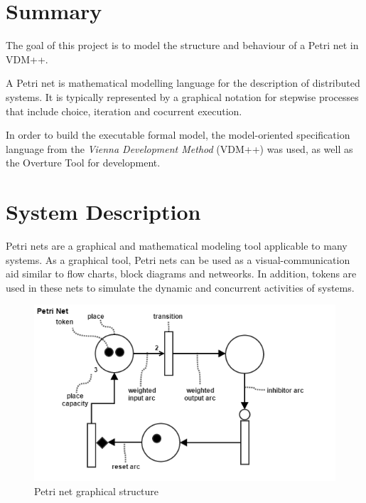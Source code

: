 \documentclass[a4paper]{article}
\begin{document}

\newpage

\section {Summary}

The goal of this project is to model the structure and behaviour of a Petri net in VDM++.

A Petri net is mathematical modelling language for the description of distributed systems. It is typically represented by a graphical notation for stepwise processes that include choice, iteration and cocurrent execution.

In order to build the executable formal model, the model-oriented specification language from the \emph{Vienna Development Method} (VDM++) was used, as well as the Overture Tool\cite{Overture} for development.

\newpage

\section {System Description}
\label{sec:system_description}

Petri nets are a graphical and mathematical modeling tool applicable to many systems. As a graphical tool, Petri nets can be used as a visual-communication aid similar to flow charts, block diagrams and netweorks. In addition, tokens are used in these nets to simulate the dynamic and concurrent activities of systems.

\begin{figure}[h]
\includegraphics[width=17cm]{petrinet.png}
\caption{Petri net graphical structure}
\end{figure}
\end{document}
